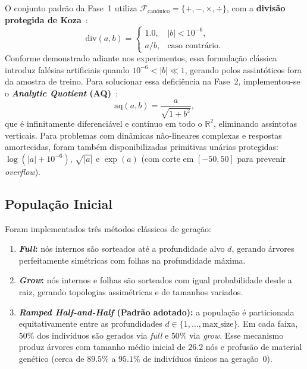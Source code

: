 O conjunto padrão da Fase~1 utiliza $\mathcal{F}_{\text{canônico}} = \{ +, -, \times, \div \}$,
com a \textbf{divisão protegida de Koza}~\cite{koza1992genetic}:
\begin{equation}
  \mathrm{div}(a,b) =
  \begin{cases}
    1.0, & |b| < 10^{-6},\\
    a/b, & \text{caso contrário.}
  \end{cases}
  \label{eq:div}
\end{equation}
Conforme demonstrado adiante nos experimentos, essa formulação clássica
introduz falésias artificiais quando $10^{-6} < |b| \ll 1$, gerando polos
assintóticos fora da amostra de treino. Para solucionar essa deficiência na
Fase~2, implementou-se o \textbf{\emph{Analytic Quotient} (AQ)}~\cite{ni2013analytic}:
\begin{equation}
  \mathrm{aq}(a,b) = \frac{a}{\sqrt{1 + b^2}},
  \label{eq:aq}
\end{equation}
que é infinitamente diferenciável e contínuo em todo o $\mathbb{R}^2$,
eliminando assíntotas verticais. Para problemas com dinâmicas não-lineares
complexas e respostas amortecidas, foram também disponibilizadas primitivas
unárias protegidas: $\log(|a| + 10^{-6})$, $\sqrt{|a|}$ e $\exp(a)$ (com corte
em $[-50, 50]$ para prevenir \emph{overflow}).

\subsection{População Inicial}
\label{sec:impl_init}

Foram implementados três métodos clássicos de geração:
\begin{enumerate}
  \item \textbf{\emph{Full}:} nós internos são sorteados até a profundidade
        alvo $d$, gerando árvores perfeitamente simétricas com folhas na
        profundidade máxima.
  \item \textbf{\emph{Grow}:} nós internos e folhas são sorteados com igual
        probabilidade desde a raiz, gerando topologias assimétricas e de
        tamanhos variados.
  \item \textbf{\emph{Ramped Half-and-Half} (Padrão adotado):} a população é
        particionada equitativamente entre as profundidades $d \in \{1, \dots, \text{max\_size}\}$.
        Em cada faixa, $50\%$ dos indivíduos são gerados via \emph{full} e
        $50\%$ via \emph{grow}. Esse mecanismo produz árvores com tamanho
        médio inicial de $26.2$ nós e profusão de material genético (cerca
        de $89.5\%$ a $95.1\%$ de indivíduos únicos na geração~0).
\end{enumerate}

